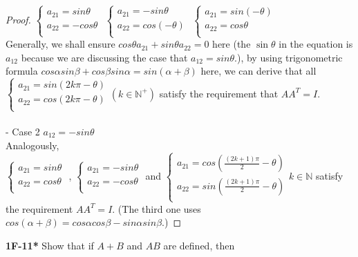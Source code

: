 \documentclass{article}
\begin{document}
\begin{proof}
$
\begin{cases}
a_{21} = sin\theta \\
a_{22} = -cos\theta \\
\end{cases}
$
$
\begin{cases}
a_{21} = -sin\theta \\
a_{22} = cos(-\theta) \\
\end{cases}
$
$
\begin{cases}
a_{21} = sin(-\theta) \\
a_{22} = cos\theta \\
\end{cases}
$
\\Generally, we shall ensure $cos\theta a_{21} + sin\theta a_{22} = 0$ here (the $\sin \theta$ in the equation is $a_{12}$ because we are discussing the case that $a_{12} = sin\theta$.), by using trigonometric formula $cos\alpha sin\beta + cos\beta sin\alpha = sin(\alpha + \beta)$ here, we can derive that all
$
\begin{cases}
a_{21} = sin(2k\pi - \theta) \\
a_{22} = cos(2k\pi - \theta) \\
\end{cases}
(k \in \mathbb{N}^+)
$
satisfy the requirement that $AA^T = I$.
\\
\\- Case 2 $a_{12} = -sin\theta$
\\ Analogously, 
\\
$
\begin{cases}
a_{21} = sin\theta \\
a_{22} = cos\theta \\
\end{cases}
$
,
$
\begin{cases}
a_{21} = -sin\theta \\
a_{22} = -cos\theta \\
\end{cases}
$
and
$
\begin{cases}
a_{21} = cos(\frac{(2k+1) \pi}{2} - \theta)\\
a_{22} = sin(\frac{(2k+1) \pi}{2} - \theta)\\
\end{cases}
k \in \mathbb{N}
$
satisfy the requirement $AA^T = I$. (The third one uses $cos(\alpha + \beta) = cos\alpha cos\beta - sin\alpha sin\beta$.) 
\end{proof}
\textbf{1F-11*} Show that if $A + B$ and $AB$ are defined, then
\end{document}
